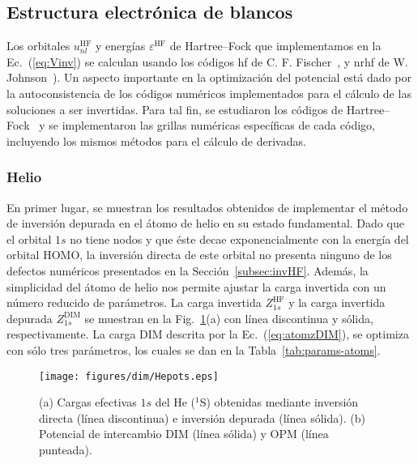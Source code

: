 \subsection{Estructura electrónica de blancos}
\label{subsec:dimtarget}

Los orbitales $u_{nl}^{\mathrm{HF}}$ y energías 
$\varepsilon^{\mathrm{HF}}$ de Hartree--Fock que implementamos en la 
Ec.~(\ref{eq:Vinv}) se calculan usando los códigos {\sc hf} de C. F. 
Fischer~\cite{FroeseFischer:97}, y {\sc nrhf} de W. 
Johnson~\cite{Johnson:07}). 
Un aspecto importante en la optimización del potencial está dado por la 
autoconsistencia de los códigos numéricos implementados para el cálculo 
de las soluciones a ser invertidas. Para tal fin, se estudiaron los 
códigos de Hartree--Fock~\cite{FroeseFischer:97,Johnson:07} y se 
implementaron las grillas numéricas específicas de cada código, 
incluyendo los mismos métodos para el cálculo de derivadas. 


\subsubsection*{Helio}

En primer lugar, se muestran los resultados obtenidos de implementar
el método de inversión depurada en el átomo de helio en su estado
fundamental. Dado que el orbital $1s$ no tiene nodos y que éste 
decae exponencialmente con la energía del orbital HOMO, la inversión 
directa de este orbital no presenta ninguno de los defectos numéricos
presentados en la Sección~\ref{subsec:invHF}. Además, la simplicidad 
del átomo de helio nos permite ajustar la carga invertida con un número 
reducido de parámetros. La carga invertida $Z_{1s}^{\mathrm{HF}}$ y la
carga invertida depurada $Z_{1s}^{\mathrm{DIM}}$ se muestran en la 
Fig.~\ref{fig:Hepots}(a) con línea discontinua y sólida, 
respectivamente. La carga DIM descrita por la Ec.~(\ref{eq:atomzDIM}), 
se optimiza con sólo tres parámetros, los cuales se dan en la 
Tabla~\ref{tab:params-atoms}. 

\begin{figure}[t]
\centering
\texttt{[image: figures/dim/Hepots.eps]}
\caption[Cargas efectivas y potencial de intercambio DIM de He.]
{(a) Cargas efectivas $1s$ del He ($^1$S) obtenidas mediante inversión 
directa (línea discontinua) e inversión depurada (línea sólida). 
(b) Potencial de intercambio DIM (línea sólida) y OPM (línea punteada).}
\label{fig:Hepots}
\end{figure}

